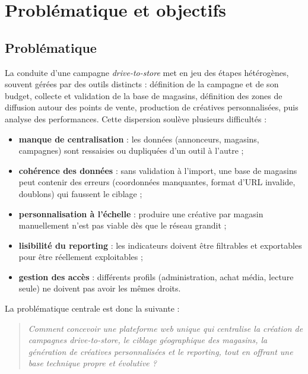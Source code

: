 \chapter{Problématique et objectifs}

\section{Problématique}

La conduite d'une campagne \emph{drive-to-store} met en jeu des étapes
hétérogènes, souvent gérées par des outils distincts : définition de la
campagne et de son budget, collecte et validation de la base de magasins,
définition des zones de diffusion autour des points de vente, production de
créatives personnalisées, puis analyse des performances. Cette dispersion
soulève plusieurs difficultés :

\begin{itemize}
  \item \textbf{manque de centralisation} : les données (annonceurs,
        magasins, campagnes) sont ressaisies ou dupliquées d'un outil à
        l'autre ;
  \item \textbf{cohérence des données} : sans validation à l'import, une base
        de magasins peut contenir des erreurs (coordonnées manquantes, format
        d'URL invalide, doublons) qui faussent le ciblage ;
  \item \textbf{personnalisation à l'échelle} : produire une créative par
        magasin manuellement n'est pas viable dès que le réseau grandit ;
  \item \textbf{lisibilité du reporting} : les indicateurs doivent être
        filtrables et exportables pour être réellement exploitables ;
  \item \textbf{gestion des accès} : différents profils (administration, achat
        média, lecture seule) ne doivent pas avoir les mêmes droits.
\end{itemize}

La problématique centrale est donc la suivante :
\begin{quote}
\itshape
Comment concevoir une plateforme web unique qui centralise la création de
campagnes drive-to-store, le ciblage géographique des magasins, la génération
de créatives personnalisées et le reporting, tout en offrant une base
technique propre et évolutive ?
\end{quote}

